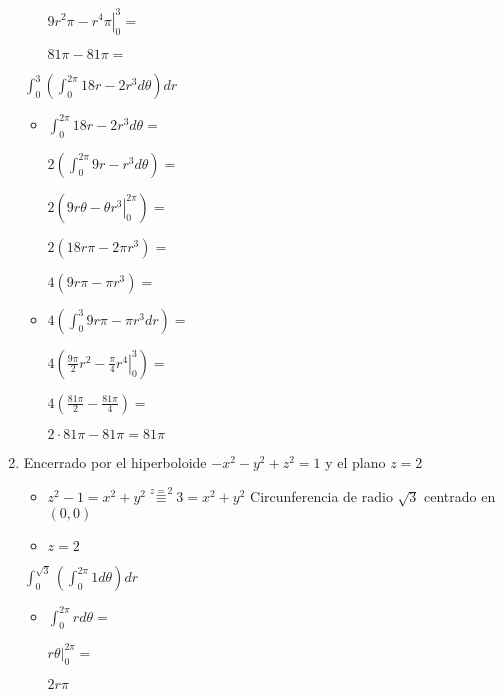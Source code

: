 \documentclass[../practica_09.tex]{subfiles}
\begin{document}
\begin{enumerate}
\begin{itemize}
                    $ \left. 9r^2\pi - r^4\pi \right |_0^3 = $

                    $ 81\pi - 81\pi = $


            \end{itemize}

            $\int_0^3 (\int_0^{2\pi} 18r - 2r^3 d\theta) dr$

            \begin{itemize}
                \item $ \int_0^{2\pi} 18r - 2r^3 d\theta = $

                    $ 2( \int_0^{2\pi} 9r - r^3 d\theta )= $

                    $ 2(\left. 9r\theta - \theta r^3 \right |_0^{2\pi}) = $

                    $ 2 ( 18r\pi - 2\pi r^3) = $

                    $ 4 (9r\pi - \pi r^3) = $

                \item $4 ( \int_0^3 9r\pi - \pi r^3 dr) = $

                    $ 4 (\left. \frac{9\pi}{2}r^2 - \frac{\pi}{4}r^4 \right |_0^3) = $

                    $ 4 ( \frac{81\pi}{2} - \frac{81\pi}{4}) = $

                    $ 2\cdot 81\pi - 81\pi = 81\pi $

            \end{itemize}

        \item Encerrado por el hiperboloide $-x^2-y^2+z^2 = 1$ y el plano $z = 2$

            \begin{itemize}
                \item $ z^2 - 1 = x^2 + y^2 \stackrel{z=2}{\equiv} 3 = x^2 + y^2 $ Circunferencia de radio $\sqrt{3}$ centrado en $(0,0)$
                \item $ z = 2 $
            \end{itemize}

            $\int_0^{\sqrt{3}}(\int_0^{2\pi} 1 d\theta)dr$

            \begin{itemize}
                \item $\int_0^{2\pi} r d\theta = $

                    $ \left. r\theta \right |_0^{2\pi} = $

                    $ 2r\pi $


\end{itemize}
\end{enumerate}
\end{document}

